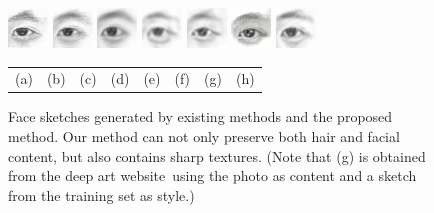 \documentclass[10pt,twocolumn,letterpaper]{article}
\begin{document}
\begin{figure}[t]
\begin{minipage}[t]{1\linewidth}
\includegraphics[width=0.11\linewidth]{img/page1_example/eye_mrf.png}
\includegraphics[width=0.11\linewidth]{img/page1_example/eye_wmrf.png}
\includegraphics[width=0.11\linewidth]{img/page1_example/eye_ssd.png}
\includegraphics[width=0.11\linewidth]{img/page1_example/eye_fcnn.png}
\includegraphics[width=0.11\linewidth]{img/page1_example/eye_bfcn.png}
\includegraphics[width=0.11\linewidth]{img/page1_example/eye_deepart.jpg}
\includegraphics[width=0.11\linewidth]{img/page1_example/eye_ours2.png}
\end{minipage}

\begin{minipage}[t]{1\linewidth}
\footnotesize
\centering
\begin{tabular}{*8{C{0.6cm}}}
(a) & (b) & (c) & (d) & (e) & (f) & (g) & (h)
\end{tabular}
\end{minipage}

\caption[Caption for LOF]{Face sketches generated by existing methods and the proposed method. Our method can not only preserve both hair and facial content, but also contains sharp textures. %
(Note that (g) is obtained from the deep art website\setcounter{footnote}{0}\footnotemark~using the photo as content and a sketch from the training set as style.)}
\label{fig:example_comp}
\end{figure}
\end{document}

